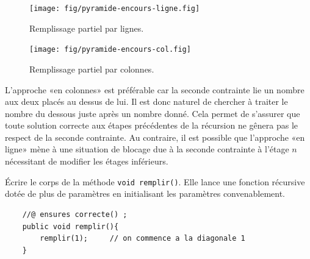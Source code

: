 \documentclass[10pt]{article}\usepackage[correction,nu]{esial}
\begin{document}
\vspace{-\baselineskip}
\begin{figure}[h] 
  \begin{minipage}{.4\linewidth}
    \centering
    \texttt{[image: fig/pyramide-encours-ligne.fig]}\vspace{-.5\baselineskip}
    \caption{Remplissage partiel par lignes.}
    \label{fig:encours:ligne}
  \end{minipage}\hfill
  \begin{minipage}{.4\linewidth} 
    \centering
    \texttt{[image: fig/pyramide-encours-col.fig]}\vspace{-.5\baselineskip}
    \caption{Remplissage partiel par colonnes.}
    \label{fig:encours:col}
  \end{minipage}
\end{figure}
\vspace{-.5\baselineskip}

L'approche «en colonnes» est préférable car la seconde contrainte lie un nombre
aux deux placés au dessus de lui. Il est donc naturel de chercher à traiter le
nombre du dessous juste après un nombre donné. Cela permet de s'assurer que
toute solution correcte aux étapes précédentes de la récursion ne gênera pas le
respect de la seconde contrainte. Au contraire, il est possible que l'approche
«en ligne» mène à une situation de blocage due à la seconde contrainte à
l'étage $n$ nécessitant de modifier les étages inférieurs.
\begin{Question}
  Écrire le corps de la méthode \texttt{void remplir()}. Elle lance une
  fonction récursive dotée de plus de paramètres en initialisant les paramètres
  convenablement.
\end{Question}
\begin{Reponse}
\begin{verbatim}
    //@ ensures correcte() ;
    public void remplir(){
        remplir(1); 	// on commence a la diagonale 1
    } 
\end{verbatim}
\end{Reponse}
\end{document}

